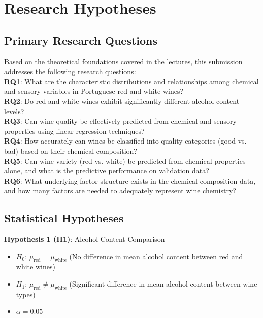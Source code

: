 \chapter{Research Hypotheses}

\section{Primary Research Questions}

Based on the theoretical foundations covered in the lectures, this submission addresses the following research questions:\\

\textbf{RQ1}: What are the characteristic distributions and relationships among chemical and sensory variables in Portuguese red and white wines?\\

\textbf{RQ2}: Do red and white wines exhibit significantly different alcohol content levels?\\

\textbf{RQ3}: Can wine quality be effectively predicted from chemical and sensory properties using linear regression techniques?\\

\textbf{RQ4}: How accurately can wines be classified into quality categories (good vs. bad) based on their chemical composition?\\

\textbf{RQ5}: Can wine variety (red vs. white) be predicted from chemical properties alone, and what is the predictive performance on validation data?\\

\textbf{RQ6}: What underlying factor structure exists in the chemical composition data, and how many factors are needed to adequately represent wine chemistry?\\

\section{Statistical Hypotheses}

\textbf{Hypothesis 1 (H1)}: Alcohol Content Comparison
\begin{itemize}
	\item $H_0$: $\mu_{\text{red}} = \mu_{\text{white}}$ (No difference in mean alcohol content between red and white wines)
	\item $H_1$: $\mu_{\text{red}} \neq \mu_{\text{white}}$ (Significant difference in mean alcohol content between wine types)
	\item $\alpha = 0.05$
\end{itemize}


